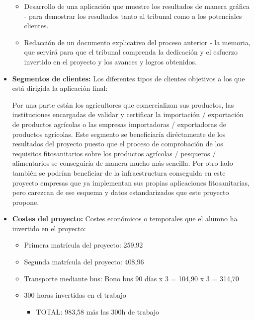 \begin{itemize}
\begin{itemize}
\item Desarrollo de una aplicación que muestre los resultados de manera gráfica - para demostrar los resultados tanto al tribunal como a los potenciales clientes.
\item Redacción de un documento explicativo del proceso anterior - la memoria, que servirá para que el tribunal comprenda la dedicación y el esfuerzo invertido en el proyecto y los avances y logros obtenidos.
\end{itemize}
\item \textbf{Segmentos de clientes:} Los diferentes tipos de clientes objetivos a los que está dirigida la aplicación final: \par Por una parte están los  agricultores que comercializan sus productos, las instituciones encargadas de validar y certificar la importación / exportación  de productos agrícolas o las empresas importadoras / exportadoras de productos agrícolas. Este segmento se beneficiaría diréctamente de los resultados del proyecto puesto que el proceso de comprobación de los requisitos fitosanitarios sobre los productos agrícolas / pesqueros / alimentarios se conseguiría de manera mucho más sencilla. Por otro lado también se podrían beneficiar de la infraestructura conseguida en este proyecto empresas que ya implementan sus propias aplicaciones fitosanitarias, pero carezcan de ese esquema y datos estandarizados que este proyecto propone.


\item \textbf{Costes del proyecto:} Costes económicos o temporales que el alumno ha invertido en el proyecto:
\begin{itemize}
\item Primera matrícula del proyecto: 259,92
\item Segunda matrícula del proyecto: 408,96
\item Transporte mediante bus: Bono bus 90 días x 3 = 104,90 x 3 = 314,70
\item 300 horas invertidas en el trabajo
\begin{itemize}
\item TOTAL: 983,58 más las 300h de trabajo
\end{itemize}
\end{itemize}
\end{itemize}

